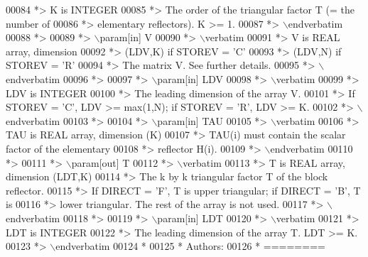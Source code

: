 \begin{DoxyCode}
00084 \textcolor{comment}{*>          K is INTEGER}
00085 \textcolor{comment}{*>          The order of the triangular factor T (= the number of}
00086 \textcolor{comment}{*>          elementary reflectors). K >= 1.}
00087 \textcolor{comment}{*> \(\backslash\)endverbatim}
00088 \textcolor{comment}{*>}
00089 \textcolor{comment}{*> \(\backslash\)param[in] V}
00090 \textcolor{comment}{*> \(\backslash\)verbatim}
00091 \textcolor{comment}{*>          V is REAL array, dimension}
00092 \textcolor{comment}{*>                               (LDV,K) if STOREV = 'C'}
00093 \textcolor{comment}{*>                               (LDV,N) if STOREV = 'R'}
00094 \textcolor{comment}{*>          The matrix V. See further details.}
00095 \textcolor{comment}{*> \(\backslash\)endverbatim}
00096 \textcolor{comment}{*>}
00097 \textcolor{comment}{*> \(\backslash\)param[in] LDV}
00098 \textcolor{comment}{*> \(\backslash\)verbatim}
00099 \textcolor{comment}{*>          LDV is INTEGER}
00100 \textcolor{comment}{*>          The leading dimension of the array V.}
00101 \textcolor{comment}{*>          If STOREV = 'C', LDV >= max(1,N); if STOREV = 'R', LDV >= K.}
00102 \textcolor{comment}{*> \(\backslash\)endverbatim}
00103 \textcolor{comment}{*>}
00104 \textcolor{comment}{*> \(\backslash\)param[in] TAU}
00105 \textcolor{comment}{*> \(\backslash\)verbatim}
00106 \textcolor{comment}{*>          TAU is REAL array, dimension (K)}
00107 \textcolor{comment}{*>          TAU(i) must contain the scalar factor of the elementary}
00108 \textcolor{comment}{*>          reflector H(i).}
00109 \textcolor{comment}{*> \(\backslash\)endverbatim}
00110 \textcolor{comment}{*>}
00111 \textcolor{comment}{*> \(\backslash\)param[out] T}
00112 \textcolor{comment}{*> \(\backslash\)verbatim}
00113 \textcolor{comment}{*>          T is REAL array, dimension (LDT,K)}
00114 \textcolor{comment}{*>          The k by k triangular factor T of the block reflector.}
00115 \textcolor{comment}{*>          If DIRECT = 'F', T is upper triangular; if DIRECT = 'B', T is}
00116 \textcolor{comment}{*>          lower triangular. The rest of the array is not used.}
00117 \textcolor{comment}{*> \(\backslash\)endverbatim}
00118 \textcolor{comment}{*>}
00119 \textcolor{comment}{*> \(\backslash\)param[in] LDT}
00120 \textcolor{comment}{*> \(\backslash\)verbatim}
00121 \textcolor{comment}{*>          LDT is INTEGER}
00122 \textcolor{comment}{*>          The leading dimension of the array T. LDT >= K.}
00123 \textcolor{comment}{*> \(\backslash\)endverbatim}
00124 \textcolor{comment}{*}
00125 \textcolor{comment}{*  Authors:}
00126 \textcolor{comment}{*  ========}

\end{DoxyCode}
